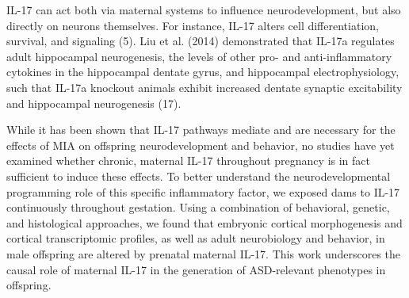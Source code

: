 \documentclass[]{article}
\begin{document}
IL-17 can act both via maternal systems to influence neurodevelopment,
but also directly on neurons themselves. For instance, IL-17 
alters cell differentiation, survival, and signaling (5). Liu et al.
(2014) demonstrated that IL-17a regulates adult hippocampal
neurogenesis, the levels of other pro- and anti-inflammatory cytokines
in the hippocampal dentate gyrus, and hippocampal electrophysiology,
such that IL-17a knockout animals exhibit increased dentate synaptic
excitability and hippocampal neurogenesis (17).

While it has been shown that IL-17 pathways mediate and are necessary
for the effects of MIA on offspring neurodevelopment and behavior, no
studies have yet examined whether chronic, maternal IL-17 throughout
pregnancy is in fact sufficient to induce these effects. To better
understand the neurodevelopmental programming role of this specific
inflammatory factor, we exposed dams to IL-17 continuously throughout
gestation. Using a combination of behavioral, genetic, and histological
approaches, we found that embryonic cortical morphogenesis and cortical
transcriptomic profiles, as well as adult neurobiology and behavior, in
male offspring are altered by prenatal maternal IL-17. This work
underscores the causal role of maternal IL-17 in the generation of
ASD-relevant phenotypes in offspring.
\end{document}
